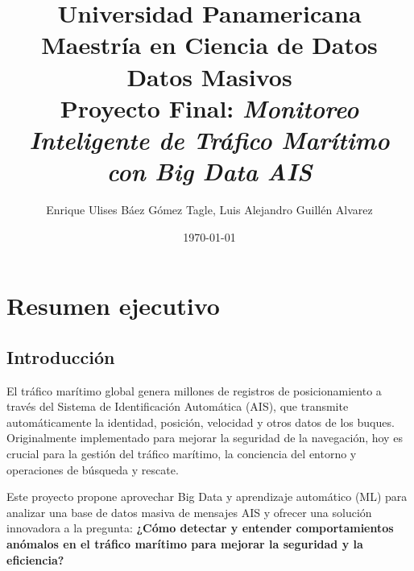 \documentclass[10pt]{article}
\title{Universidad Panamericana \\ Maestría en Ciencia de Datos \\ Datos Masivos \\ 
    \vspace{0.5cm} Proyecto Final: \textit{Monitoreo Inteligente de Tráfico Marítimo con Big Data AIS}}
\author{Enrique Ulises Báez Gómez Tagle, Luis Alejandro Guillén Alvarez}
\date{\today}
\begin{document}
\maketitle

\tableofcontents

\newpage

\section{Resumen ejecutivo}
\subsection{Introducción} %

El tráfico marítimo global genera millones de registros de posicionamiento a través del Sistema de Identificación Automática (AIS), que transmite automáticamente la identidad, posición, velocidad y otros datos de los buques. Originalmente implementado para mejorar la seguridad de la navegación, hoy es crucial para la gestión del tráfico marítimo, la conciencia del entorno y operaciones de búsqueda y rescate.

Este proyecto propone aprovechar Big Data y aprendizaje automático (ML) para analizar una base de datos masiva de mensajes AIS y ofrecer una solución innovadora a la pregunta: \textbf{¿Cómo detectar y entender comportamientos anómalos en el tráfico marítimo para mejorar la seguridad y la eficiencia?}
\end{document}

